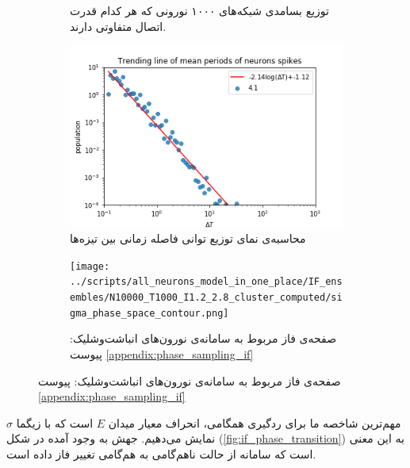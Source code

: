 \begin{figure}
\begin{subfigure}[b]{0.5\textwidth}
		\caption{توزیع بسامدی شبکه‌های ۱۰۰۰ نورونی که هر کدام قدرت اتصال متفاوتی دارند. }
		\label{fig:if_isi}
	\end{subfigure}
	\hfill
	\begin{subfigure}[b]{0.5\textwidth}
		\centering
		\includegraphics[width = \textwidth]{../papers_studies/figs/IF/mean_spiking_persiods_with_trending_line.png}
		\caption{محاسبه‌ی نمای توزیع توانی فاصله زمانی بین تیزه‌ها}
		\label{fig:if_isi_trending_line}
	\end{subfigure}
	\hfill
	\begin{subfigure}[b]{0.5\textwidth}
		\centering
		\texttt{[image: ../scripts/all\_neurons\_model\_in\_one\_place/IF\_ensembles/N10000\_T1000\_I1.2\_2.8\_cluster\_computed/sigma\_phase\_space\_contour.png]}
		\caption{صفحه‌ی فاز مربوط به سامانه‌ی نورون‌های انباشت‌وشلیک: پیوست \ref{appendix:phase_sampling_if}}
		\label{fig:if_g_d_phase_space_if}
	\end{subfigure}
\end{figure}

مهم‌ترین شاخصه ما برای ردگیری همگامی، انحراف معیار میدان $E$ است که با زیگما $\sigma$ نمایش می‌دهیم. جهش به وجود آمده در شکل‌ (\ref{fig:if_phase_transition}) به این معنی است که سامانه از حالت ناهم‌گامی به هم‌گامی تغییر فاز داده است. 



